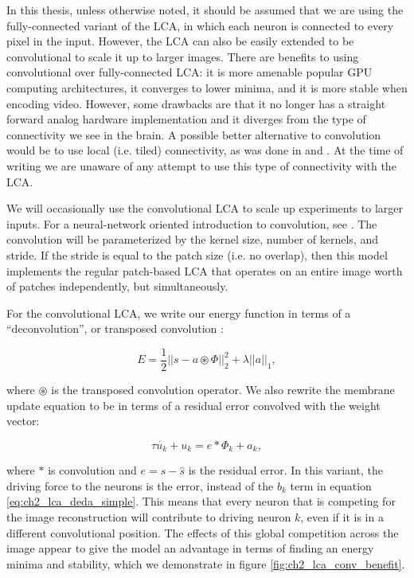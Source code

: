 In this thesis, unless otherwise noted, it should be assumed that we are using the fully-connected variant of the LCA, in which each neuron is connected to every pixel in the input. However, the LCA can also be easily extended to be convolutional to scale it up to larger images. There are benefits to using convolutional over fully-connected LCA: it is more amenable popular GPU computing architectures, it converges to lower minima, and it is more stable when encoding video. However, some drawbacks are that it no longer has a straight forward analog hardware implementation and it diverges from the type of connectivity we see in the brain. A possible better alternative to convolution would be to use local (i.e. tiled) connectivity, as was done in \parencite{le2011building} and \parencite{ngiam2010tiled}. At the time of writing we are unaware of any attempt to use this type of connectivity with the LCA.

We will occasionally use the convolutional LCA to scale up experiments to larger inputs. For a neural-network oriented introduction to convolution, see \parencite{goodfellow2016deep}. The convolution will be parameterized by the kernel size, number of kernels, and stride. If the stride is equal to the patch size (i.e. no overlap), then this model implements the regular patch-based LCA that operates on an entire image worth of patches independently, but simultaneously.

For the convolutional LCA, we write our energy function in terms of a ``deconvolution'', or transposed convolution \parencite{zeiler2010deconvolutional}:

\begin{equation}
    E = \frac{1}{2} || s - a \circledast \Phi ||^{2}_{2} + \lambda ||a||_{1},
\end{equation}

\noindent where $\circledast$ is the transposed convolution operator. We also rewrite the membrane update equation to be in terms of a residual error convolved with the weight vector:

\begin{equation}\label{eq:ch2_conv_lca_dynamics}
   \tau \dot{u_{k}} + u_{k} = e \ast \Phi_{k} + a_{k},
\end{equation}

\noindent where $\ast$ is convolution and $e = s - \hat{s}$ is the residual error. In this variant, the driving force to the neurons is the error, instead of the $b_{k}$ term in equation \eqref{eq:ch2_lca_deda_simple}. This means that every neuron that is competing for the image reconstruction will contribute to driving neuron $k$, even if it is in a different convolutional position. The effects of this global competition across the image appear to give the model an advantage in terms of finding an energy minima and stability, which we demonstrate in figure \ref{fig:ch2_lca_conv_benefit}.


